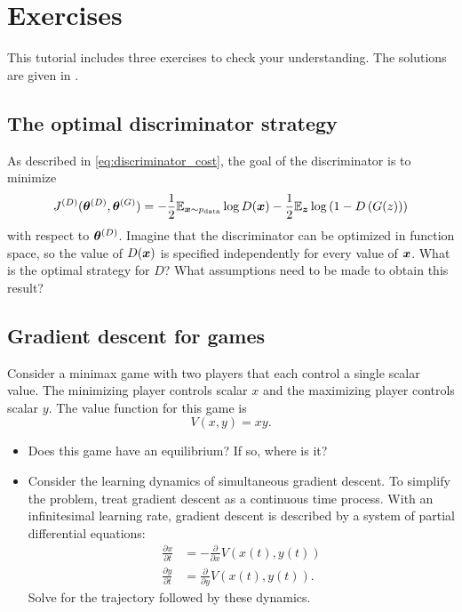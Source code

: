 \section{Exercises}

This tutorial includes three exercises to check your understanding.
The solutions are given in .

\subsection{The optimal discriminator strategy}
\label{sec:opt_d}

As described in \eqref{eq:discriminator_cost}, the goal of the discriminator is to minimize
\begin{equation}
  J^{(D)}({\bm{\theta}}^{(D)}, {\bm{\theta}}^{(G)}) = -\frac{1}{2} \mathbb{E}_{{\bm{x}} \sim p_{\rm{data}}} \log D({\bm{x}}) - \frac{1}{2} \mathbb{E}_{{\bm{z}}} \log \left(1 - D\left( G(z) \right) \right)
\end{equation}
with respect to ${\bm{\theta}}^{(D)}$.
Imagine that the discriminator can be optimized in function space, so the value of
$D({\bm{x}})$ is specified independently for every value of ${\bm{x}}$.
What is the optimal strategy for $D$?
What assumptions need to be made to obtain this result?

\subsection{Gradient descent for games}
\label{sec:xy_exercise}

Consider a minimax game with two players that each control a single scalar value.
The minimizing player controls scalar $x$ and the maximizing player controls
scalar $y$.
The value function for this game is
\[ V(x, y) = x y .\]

\begin{itemize}
  \item Does this game have an equilibrium? If so, where is it?
  \item Consider the learning dynamics of simultaneous gradient descent.
        To simplify the problem, treat gradient descent as a continuous time
        process.
        With an infinitesimal learning rate, gradient descent is described by a system of partial differential equations:
        \begin{align}
          \frac{\partial x}{\partial t} &= - \frac{\partial}{\partial x} V\left( x(t), y(t) \right) \\
          \frac{\partial y}{\partial t} &= \frac{\partial}{\partial y} V\left( x(t), y(t) \right).
        \end{align}
        Solve for the trajectory followed by these dynamics.
\end{itemize}



